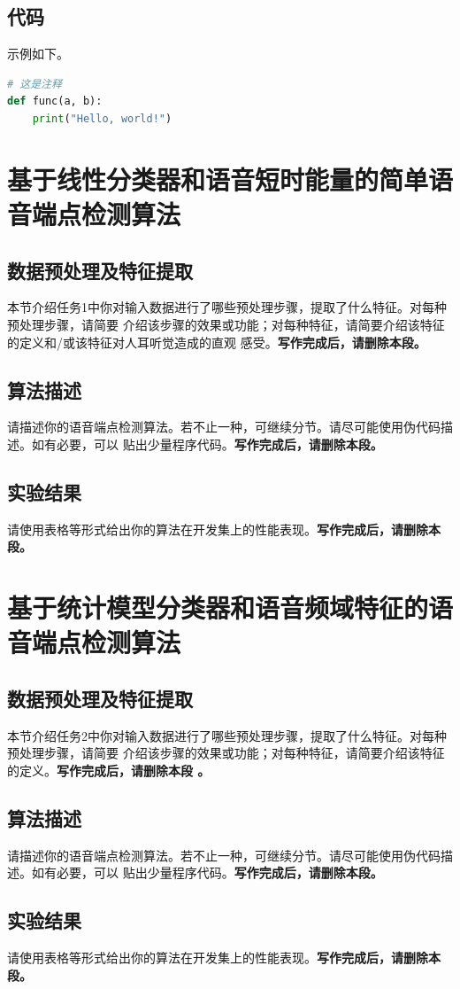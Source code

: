 \documentclass[a4paper]{article}
\begin{document}
\subsection{代码}

示例如下。

\begin{lstlisting}[language=python]
# 这是注释
def func(a, b):
    print("Hello, world!")
\end{lstlisting}

\section{基于线性分类器和语音短时能量的简单语音端点检测算法}

\subsection{数据预处理及特征提取}

本节介绍任务1中你对输入数据进行了哪些预处理步骤，提取了什么特征。对每种预处理步骤，请简要
介绍该步骤的效果或功能；对每种特征，请简要介绍该特征的定义和/或该特征对人耳听觉造成的直观
感受。\textbf{写作完成后，请删除本段。}

\subsection{算法描述}

请描述你的语音端点检测算法。若不止一种，可继续分节。请尽可能使用伪代码描述。如有必要，可以
贴出少量程序代码。\textbf{写作完成后，请删除本段。}

\subsection{实验结果}

请使用表格等形式给出你的算法在开发集上的性能表现。\textbf{写作完成后，请删除本段。}

\section{基于统计模型分类器和语音频域特征的语音端点检测算法}

\subsection{数据预处理及特征提取}

本节介绍任务2中你对输入数据进行了哪些预处理步骤，提取了什么特征。对每种预处理步骤，请简要
介绍该步骤的效果或功能；对每种特征，请简要介绍该特征的定义。\textbf{写作完成后，请删除本段
。}

\subsection{算法描述}

请描述你的语音端点检测算法。若不止一种，可继续分节。请尽可能使用伪代码描述。如有必要，可以
贴出少量程序代码。\textbf{写作完成后，请删除本段。}

\subsection{实验结果}

请使用表格等形式给出你的算法在开发集上的性能表现。\textbf{写作完成后，请删除本段。}
\end{document}
